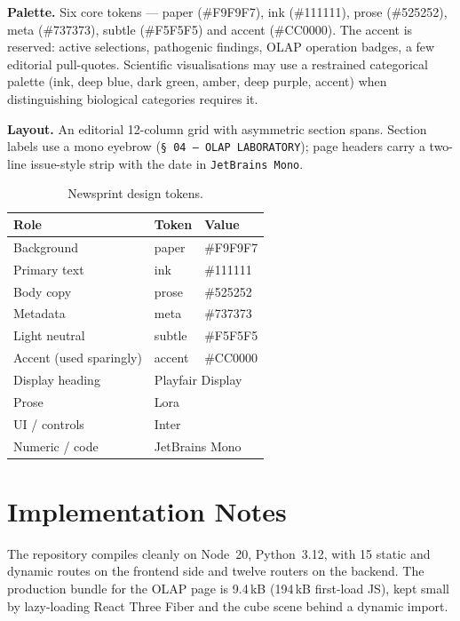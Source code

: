 \documentclass[conference,10pt]{IEEEtran}
\begin{document}
\textbf{Palette.} Six core tokens --- paper (\#F9F9F7), ink (\#111111),
prose (\#525252), meta (\#737373), subtle (\#F5F5F5) and accent
(\#CC0000). The accent is reserved: active selections, pathogenic
findings, OLAP operation badges, a few editorial pull-quotes.
Scientific visualisations may use a restrained categorical palette
(ink, deep blue, dark green, amber, deep purple, accent) when
distinguishing biological categories requires it.

\textbf{Layout.} An editorial 12-column grid with asymmetric section
spans. Section labels use a mono eyebrow (\texttt{\S\,04 --- OLAP
LABORATORY}); page headers carry a two-line issue-style strip with the
date in \texttt{JetBrains Mono}.

\begin{table}[t]
\centering
\caption{Newsprint design tokens.}
\label{tab:newsprint}
\begin{tabular}{lll}
\toprule
\textbf{Role} & \textbf{Token} & \textbf{Value}\\
\midrule
Background       & paper   & \#F9F9F7\\
Primary text     & ink     & \#111111\\
Body copy        & prose   & \#525252\\
Metadata         & meta    & \#737373\\
Light neutral    & subtle  & \#F5F5F5\\
Accent (used sparingly) & accent & \#CC0000\\
\midrule
Display heading  & \multicolumn{2}{l}{Playfair Display}\\
Prose            & \multicolumn{2}{l}{Lora}\\
UI / controls    & \multicolumn{2}{l}{Inter}\\
Numeric / code   & \multicolumn{2}{l}{JetBrains Mono}\\
\bottomrule
\end{tabular}
\end{table}

\section{Implementation Notes}
The repository compiles cleanly on Node~20, Python~3.12, with 15 static
and dynamic routes on the frontend side and twelve routers on the
backend. The production bundle for the OLAP page is 9.4\,kB (194\,kB
first-load JS), kept small by lazy-loading React Three Fiber and the
cube scene behind a dynamic import.
\end{document}
